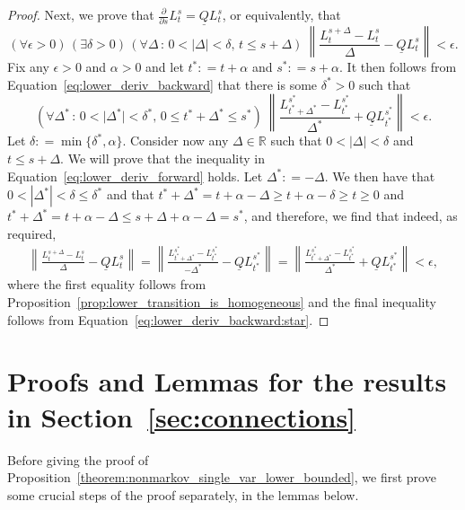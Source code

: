 \documentclass[10pt,a4paper]{paper}
\theoremstyle{definition}
\newcommand{\reals}{\mathbb{R}}
\newcommand{\lbound}{L}
\newcommand{\lrate}{\underline{Q}}
\newcommand{\norm}[1]{\left\lVert #1 \right\rVert}
\newcommand{\abs}[1]{\left\vert #1 \right\vert}
\newcommand{\coloneqq}{:\!=}
\begin{document}
\begin{proof}
Next, we prove that $\frac{\partial}{\partial s}L_t^s=\lrate L_t^s$, or equivalently, that
\begin{equation}\label{eq:lower_deriv_forward}
(\forall\epsilon>0)\,
(\exists\delta>0)\,
(\forall\Delta\,:\,0<\lvert\Delta\rvert<\delta,\,t\leq s+\Delta)~
\norm{\frac{L_{t}^{s+\Delta}-L_t^s}{\Delta}-\lrate\lbound_t^s }<\epsilon.
\end{equation}
Fix any $\epsilon>0$ and $\alpha>0$ and let $t^*\coloneqq t+\alpha$ and $s^*\coloneqq s+\alpha$. It then follows from Equation~\eqref{eq:lower_deriv_backward} that there is some $\delta^*>0$ such that
\begin{equation}\label{eq:lower_deriv_backward:star}
(\forall\Delta^*\,:\,0<\lvert\Delta^*\rvert <\delta^*,\,0\leq t^*+\Delta^*\leq s^*)~
\norm{\frac{L_{t^*+\Delta^*}^{s^*}-L_{t^*}^{s^*}}{\Delta^*}+\lrate L_{t^*}^{s^*}}<\epsilon.
\end{equation}
Let $\delta\coloneqq\min\{\delta^*,\alpha\}$. Consider now any $\Delta\in\reals$ such that $0<\abs{\Delta}<\delta$ and $t\leq s+\Delta$. We will prove that the inequality in Equation~\eqref{eq:lower_deriv_forward} holds. Let $\Delta^*\coloneqq-\Delta$. We then have that $0<\abs{\Delta^*}<\delta\leq\delta^*$ and that $t^*+\Delta^*=t+\alpha-\Delta\geq t+\alpha-\delta\geq t\geq 0$ and $t^*+\Delta^*=t+\alpha-\Delta\leq s+\Delta+\alpha-\Delta=s^*$, and therefore, we find that indeed, as required,
\begin{align*}
\norm{\frac{L_{t}^{s+\Delta}-L_t^s}{\Delta}-\lrate\lbound_t^s}
= \norm{\frac{L_{t^*+\Delta^*}^{s^*}-L_{t^*}^{s^*}}{-\Delta^*}-\lrate\lbound_{t^*}^{s^*}}
= \norm{\frac{L_{t^*+\Delta^*}^{s^*}-L_{t^*}^{s^*}}{\Delta^*}+\lrate\lbound_{t^*}^{s^*}}<\epsilon,
\end{align*}
where the first equality follows from Proposition~\ref{prop:lower_transition_is_homogeneous} and the final inequality follows from Equation~\eqref{eq:lower_deriv_backward:star}.
\end{proof}

\section{Proofs and Lemmas for the results in Section~\ref{sec:connections}}

Before giving the proof of Proposition~\ref{theorem:nonmarkov_single_var_lower_bounded}, we first prove some crucial steps of the proof separately, in the lemmas below.
\end{document}
